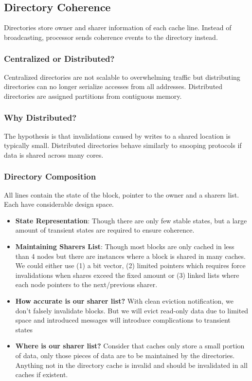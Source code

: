 \documentclass{article}
\begin{document}
\begin{multicols*}{2}
\subsection{Directory Coherence}
Directories store owner and sharer information of each cache line. Instead of broadcasting, processor sends coherence events to the directory instead.

\subsubsection{Centralized or Distributed?}
Centralized directories are not scalable to overwhelming traffic but distributing directories can no longer serialize accesses from all addresses. Distributed directories are assigned partitions from contiguous memory.

\subsubsection{Why Distributed?}
The hypothesis is that invalidations caused by writes to a shared location is typically small. Distributed directories behave similarly to snooping protocols if data is shared across many cores.

\subsubsection{Directory Composition}
All lines contain the state of the block, pointer to the owner and a sharers list. Each have considerable design space.
\begin{itemize}
    \item \textbf{State Representation}: Though there are only few stable states, but a large amount of transient states are required to ensure coherence.
    \item \textbf{Maintaining Sharers List}: Though most blocks are only cached in less than 4 nodes but there are instances where a block is shared in many caches. We could either use (1) a bit vector, (2) limited pointers which requires force invalidations when shares exceed the fixed amount or (3) linked lists where each node pointers to the next/previous sharer.
    \item \textbf{How accurate is our sharer list?} With clean eviction notification, we don't falsely invalidate blocks. But we will evict read-only data due to limited space and introduced messages will introduce complications to transient states
    \item \textbf{Where is our sharer list?} Consider that caches only store a small portion of data, only those pieces of data are to be maintained by the directories. Anything not in the directory cache is invalid and should be invalidated in all caches if existent.
\end{itemize}


\end{multicols*}
\end{document}
